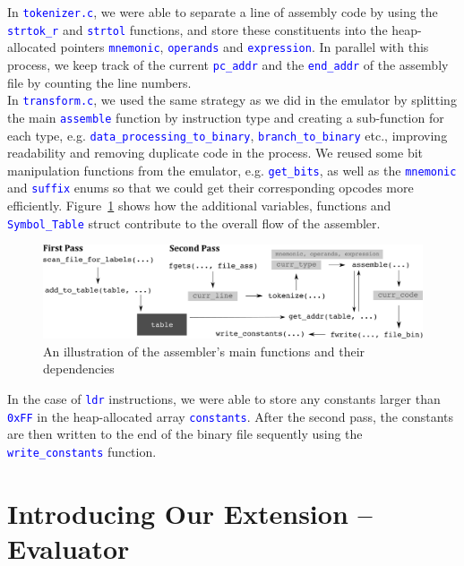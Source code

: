 \documentclass[11pt]{article}
\newcommand{\code}[1]{\mbox{\texttt{\textcolor{blue}{#1}}}}
\begin{document}
In \code{tokenizer.c}, we were able to separate a line of assembly code by using the \code{strtok\_r} and \code{strtol} functions, and store these constituents into the heap-allocated pointers \code{mnemonic}, \code{operands} and \code{expression}. In parallel with this process, we keep track of the current \code{pc\_addr} and the \code{end\_addr} of the assembly file by counting the line numbers.\\

In \code{transform.c}, we used the same strategy as we did in the emulator by splitting the main \code{assemble} function by instruction type and creating a sub-function for each type, e.g. \code{data\_processing\_to\_binary}, \code{branch\_to\_binary} etc., improving readability and removing duplicate code in the process. We reused some bit manipulation functions from the emulator, e.g. \code{get\_bits}, as well as the \code{mnemonic} and \code{suffix} enums so that we could get their corresponding opcodes more efficiently. Figure~\ref{fig:assembler_flow} shows how the additional variables, functions and \code{Symbol\_Table} struct contribute to the overall flow of the assembler.\\

\begin{figure}[h]
\centering
\includegraphics[width=\linewidth]{assembler_flow}
\caption{An illustration of the assembler's main functions and their dependencies}
\label{fig:assembler_flow}
\end{figure}

In the case of \code{ldr} instructions, we were able to store any constants larger than \code{0xFF} in the heap-allocated array \code{constants}. After the second pass, the constants are then written to the end of the binary file sequently using the \code{write\_constants} function.

\section{Introducing Our Extension – Evaluator}
\end{document}
